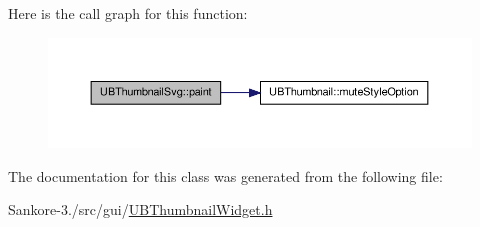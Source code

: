 Here is the call graph for this function\-:
\nopagebreak
\begin{figure}[H]
\begin{center}
\leavevmode
\includegraphics[width=350pt]{df/d68/class_u_b_thumbnail_svg_abd17c3187118187411144d3df27afd6d_cgraph}
\end{center}
\end{figure}




The documentation for this class was generated from the following file\-:\begin{DoxyCompactItemize}
\item 
Sankore-\/3./src/gui/\hyperlink{_u_b_thumbnail_widget_8h}{U\-B\-Thumbnail\-Widget.\-h}\end{DoxyCompactItemize}
